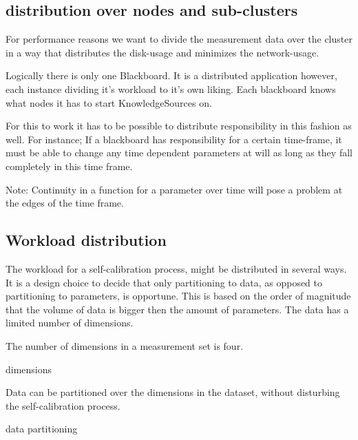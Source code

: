 \documentclass[]{lofar}
\begin{document}
    \subsection{distribution over nodes and sub-clusters}
    \label{subsec:distribution}\hypertarget{subsec:distribution}{}%

      For performance reasons we want to divide the measurement data
      over the cluster in a way that distributes the disk-usage and
      minimizes the network-usage.

      Logically there is only one Blackboard. It is a distributed
      application however, each instance dividing it's workload to
      it's own liking. Each blackboard knows what nodes it has to
      start KnowledgeSources on.

      For this to work it has to be possible to distribute
      responsibility in this fashion as well. For instance; If a
      blackboard has responsibility for a certain time-frame, it must
      be able to change any time dependent parameters at will as long
      as they fall completely in this time frame.
      \begin{em}\large{Note: }Continuity in a function for a parameter
      over time will pose a problem at the edges of the time
      frame.\end{em}

    \subsection{Workload distribution}
    \label{subsec:workload-distribution}\hypertarget{subsec:workload-distribution}{}%

      The workload for a self-calibration process, might be
      distributed in several ways. It is a design choice to decide
      that only partitioning to data, as opposed to partitioning to
      parameters, is opportune. This is based on the order of
      magnitude that the volume of data is bigger then the amount of
      parameters. The data has a limited number of dimensions.

      \begin{assumption}
        The number of dimensions in a measurement set is four.
        \caption{dimensions\label{ass:dimensions}}
      \end{assumption}

      \begin{assumption}
        Data can be partitioned over the dimensions in the dataset,
        without disturbing the self-calibration process.
        \caption{data partitioning\label{ass:partitioning}}
      \end{assumption}
\end{document}
